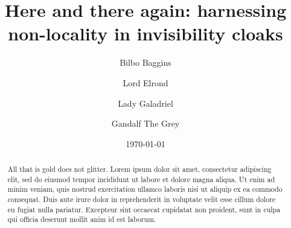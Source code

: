 \documentclass[aps,reprint,groupedaddress]{revtex4-1}
\begin{document}
\title{Here and there again: harnessing non-locality in invisibility cloaks}\author{Bilbo Baggins}

\author{Lord Elrond}
 \author{Lady Galadriel}
 \author{Gandalf The Grey}
 
\date{\today}  

\begin{abstract}
All that is gold does not glitter. Lorem ipsum dolor sit amet,
consectetur adipiscing elit, sed do eiusmod tempor incididunt ut labore
et dolore magna aliqua. Ut enim ad minim veniam, quis nostrud
exercitation ullamco laboris nisi ut aliquip ex ea commodo consequat.
Duis aute irure dolor in reprehenderit in voluptate velit esse cillum
dolore eu fugiat nulla pariatur. Excepteur sint occaecat cupidatat non
proident, sunt in culpa qui officia deserunt mollit anim id est laborum.
\end{abstract}

\maketitle

\lipsum[2-6]
\end{document}
